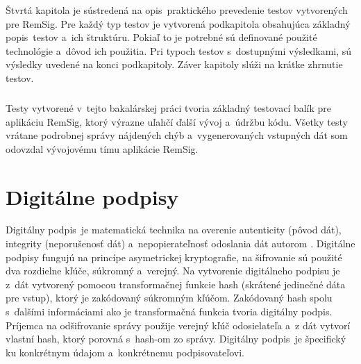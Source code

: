 \documentclass[
  digital, %
  table,   %
oneside,
  nolof,     %
  nolot,     %
]{fithesis3}
\begin{document}
Štvrtá kapitola je sústredená na opis~praktického prevedenie  testov vytvorených pre RemSig. Pre každý typ testov je vytvorená podkapitola obsahujúca základný popis~testov a~ich štruktúru. Pokiaľ to je potrebné sú definované použité technológie a~dôvod ich použitia. Pri typoch testov s~dostupnými výsledkami, sú výsledky uvedené na konci podkapitoly. Záver kapitoly slúži na krátke zhrnutie testov.\paragraph{}
Testy vytvorené v~tejto bakalárskej práci tvoria základný testovací balík pre aplikáciu RemSig, ktorý výrazne uľahčí ďalší vývoj a~údržbu kódu. Všetky testy vrátane podrobnej správy nájdených chýb a~vygenerovaných vstupných dát som odovzdal vývojovému tímu aplikácie RemSig.
\chapter{Digitálne podpisy}
Digitálny podpis~je matematická technika na overenie autenticity (pôvod dát), integrity (neporušenosť dát) a~nepopierateľnosť odoslania dát autorom \cite{digitalSignature}.  Digitálne podpisy fungujú na princípe asymetrickej kryptografie, na šifrovanie sú použité dva rozdielne kľúče, súkromný a~verejný. Na vytvorenie digitálneho podpisu je z~dát vytvorený pomocou transformačnej funkcie  hash (skrátené jedinečné dáta pre vstup), ktorý je zakódovaný súkromným kľúčom. Zakódovaný hash spolu s~ďalšími informáciami ako je transformačná funkcia  tvoria digitálny podpis. Príjemca na odšifrovanie  správy použije verejný kľúč odosielateľa a~z dát vytvorí vlastní hash, ktorý porovná s~hash-om zo správy.  Digitálny podpis~je špecifický ku konkrétnym údajom a~konkrétnemu podpisovateľovi.
\end{document}
